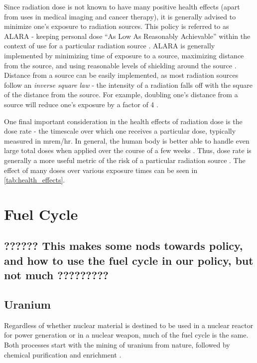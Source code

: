 \documentclass{report}
\begin{document}
Since radiation dose is not known to have many positive health effects (apart from uses in medical imaging and cancer therapy), it is generally advised to minimize one's exposure to radiation sources. This policy is referred to as ALARA - keeping personal dose \enquote{As Low As Reasonably Achievable} within the context of use for a particular radiation source \cite{Cember2008}. ALARA is generally implemented by minimizing time of exposure to a source, maximizing distance from the source, and using reasonable levels of shielding around the source \cite{Cherry2012}. Distance from a source can be easily implemented, as most radiation sources follow an \textit{inverse square law} - the intensity of a radiation falls off with the square of the distance from the source. For example, doubling one's distance from a source will reduce one's exposure by a factor of 4 \cite{Stabin2007}.

One final important consideration in the health effects of radiation dose is the dose rate - the timescale over which one receives a particular dose, typically measured in mrem/hr. In general, the human body is better able to handle even large total doses when applied over the course of a few weeks \cite{Stabin2007}. Thus, dose rate is generally a more useful metric of the risk of a particular radiation source \cite{Cherry2012}. The effect of many doses over various exposure times can be seen in \autoref{tab:health_effects}.











\section{Fuel Cycle}



\subsection{??????  This makes some nods towards policy, and how to use the fuel cycle in our policy, but not much  ?????????}


\subsection{Uranium}

Regardless of whether nuclear material is destined to be used in a nuclear reactor for power generation or in a nuclear weapon, much of the fuel cycle is the same. Both processes start with the mining of uranium from nature, followed by chemical purification and enrichment \cite{Moody2014}.
\end{document}
